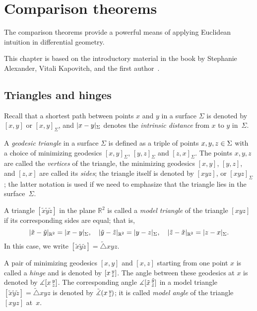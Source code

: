 \chapter{Comparison theorems}
\label{chap:comparison}

The comparison theorems provide a powerful means of applying Euclidean intuition in differential geometry.

This chapter is based on the introductory material in the book by Stephanie Alexander, Vitali Kapovitch, and the first author~\cite{alexander-kapovitch-petrunin2027}.

\section{Triangles and hinges}

Recall that a shortest path between points $x$ and $y$ in a surface $\Sigma$ is denoted by $[x,y]$ or $[x,y]_\Sigma$, and
$\dist{x}{y}\Sigma$ denotes the \emph{intrinsic distance} from $x$ to $y$ in~$\Sigma$.

A \emph{geodesic triangle} in a surface $\Sigma$ is defined as a triple of points $x,y,z\z\in \Sigma$ with a choice of minimizing geodesics $[x,y]_\Sigma$, $[y,z]_\Sigma$ and $[z,x]_\Sigma$.
The points $x,y,z$ are called the {}\emph{vertices} of the triangle,
the minimizing geodesics $[x,y]$, $[y,z]$, and $[z,x]$ are called its {}\emph{sides};
the triangle itself is denoted by $[xyz]$, or $[xyz]_\Sigma$;
the latter notation is used if we need to emphasize that the triangle lies in the surface~$\Sigma$.

A triangle $[\tilde x\tilde y\tilde z]$ in the plane $\mathbb{R}^2$ is called a \emph{model triangle} of the triangle $[xyz]$
if its corresponding sides are equal;
that is,
\[\dist{\tilde x}{\tilde y}{\mathbb{R}^2}=\dist{x}{y}\Sigma,
\quad
\dist{\tilde y}{\tilde z}{\mathbb{R}^2}=\dist{y}{z}\Sigma,
\quad
\dist{\tilde z}{\tilde x}{\mathbb{R}^2}=\dist{z}{x}\Sigma.
\]
In this case, we write $[\tilde x\tilde y\tilde z]=\tilde\triangle xyz$.

A pair of minimizing geodesics $[x,y]$ and $[x,z]$ starting from one point $x$ is called a \emph{hinge} and is denoted by $[x\,{}^{y}_{z}]$.
The angle between these geodesics at $x$ is denoted by $\measuredangle[x\,{}^{y}_{z}]$.
The corresponding angle $\measuredangle[\tilde x\,{}^{\tilde y}_{\tilde z}]$ in a model triangle $[\tilde x\tilde y\tilde z]=\tilde\triangle xyz$ is denoted by $\tilde\measuredangle(x\,{}^{y}_{z}\hspace{-0.2ex})$;
it is called \emph{model angle} of the triangle $[xyz]$ at~$x$.

